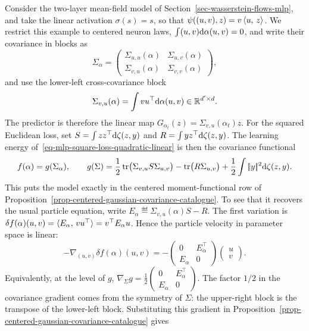 \begin{example}
	Consider the two-layer mean-field model of Section~\ref{sec-wasserstein-flows-mlp}, and take the linear activation $\sigma(s)=s$, so that $\psi((u,v),z)=v\,\langle u,\,z\rangle$.
	We restrict this example to centered neuron laws, $\int (u,v)\mathrm{d}\alpha(u,v)=0$, and write their covariance in blocks as
	\[
		\Sigma_\alpha=
		\begin{pmatrix}
			\Sigma_{u,u}(\alpha) & \Sigma_{u,v}(\alpha)\\
			\Sigma_{v,u}(\alpha) & \Sigma_{v,v}(\alpha)
		\end{pmatrix},
	\]
	and use the lower-left cross-covariance block
	\[
		\Sigma_{v,u}(\alpha)=\int v u^\top\mathrm{d}\alpha(u,v)\in\mathbb{R}^{d'\times d}.
	\]
	The predictor is therefore the linear map $G_{\alpha_t}(z)=\Sigma_{v,u}(\alpha_t)z$. For the squared Euclidean loss, set $S=\int zz^\top\mathrm{d}\zeta(z,y)$ and $R=\int y z^\top\mathrm{d}\zeta(z,y)$.
	The learning energy of~\eqref{eq-mlp-square-loss-quadratic-linear} is then the covariance functional
	\[
		f(\alpha)=g(\Sigma_\alpha),
		\qquad
		g(\Sigma)
		=
		\frac12\operatorname{tr}\!\big(\Sigma_{v,u}S\Sigma_{u,v}\big)
		-\operatorname{tr}\!\big(R\Sigma_{u,v}\big)
		+\frac12\int|\!| y |\!|^2\mathrm{d}\zeta(z,y).
	\]
	This puts the model exactly in the centered moment-functional row of Proposition~\ref{prop-centered-gaussian-covariance-catalogue}. To see that it recovers the usual particle equation, write $E_\alpha\eqdef \Sigma_{v,u}(\alpha)S-R$. The first variation is $\delta f(\alpha)(u,v)=\langle E_\alpha,\,v u^\top\rangle=v^\top E_\alpha u$.
	Hence the particle velocity in parameter space is linear:
	\[
		-\nabla_{(u,v)}\delta f(\alpha)(u,v)
		=
		-\begin{pmatrix}
			0 & E_\alpha^\top \\
			E_\alpha & 0
		\end{pmatrix}
		\begin{pmatrix} u \\ v \end{pmatrix}.
	\]
	Equivalently, at the level of $g$, \(\nabla_\Sigma g=\frac12\begin{pmatrix}0 & E_\alpha^\top\\ E_\alpha & 0\end{pmatrix}\).
	The factor \(1/2\) in the covariance gradient comes from the symmetry of \(\Sigma\): the upper-right block is the transpose of the lower-left block. Substituting this gradient in Proposition~\ref{prop-centered-gaussian-covariance-catalogue} gives

\end{example}
